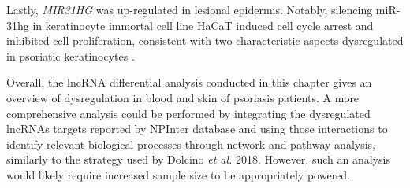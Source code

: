 
Lastly, \textit{MIR31HG} was up-regulated in lesional epidermis. Notably, silencing miR-31hg in keratinocyte immortal cell line HaCaT induced cell cycle arrest and inhibited cell proliferation, consistent with two characteristic aspects dysregulated in psoriatic keratinocytes \parencite{Gao2018}.

Overall, the lncRNA differential analysis conducted in this chapter gives an overview of dysregulation in blood and skin of psoriasis patients. A more comprehensive analysis could be performed by integrating the dysregulated lncRNAs targets reported by NPInter database and  using those interactions to identify relevant biological processes through network and pathway analysis, similarly to the strategy used by Dolcino \textit{et al.} 2018. However, such an analysis would likely require increased sample size to be appropriately powered.



